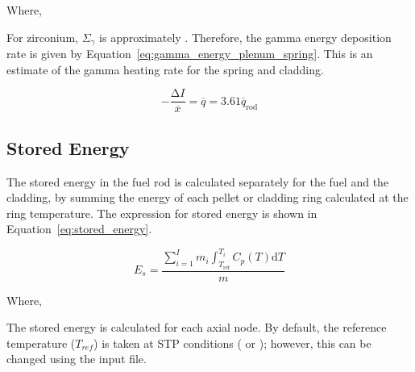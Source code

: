 Where,


For zirconium, \(\Sigma_{\gamma}\) is approximately . Therefore, the gamma energy
deposition rate is given by Equation~\ref{eq:gamma_energy_plenum_spring}. This is an estimate of the
gamma heating rate for the spring and cladding.

\begin{equation}
    \label{eq:gamma_energy_plenum_spring}
    -\frac{\mathrm{\Delta}I}{\overline{x}} = \overline{q} = 3.61{\overline{q}}_{\text{rod}}
\end{equation}

\subsection{Stored Energy}\label{section:stored-energy}

The stored energy in the fuel rod is calculated separately for the fuel and the cladding, by summing
the energy of each pellet or cladding ring calculated at the ring temperature. The expression for
stored energy is shown in Equation~\ref{eq:stored_energy}.

\begin{equation}
    \label{eq:stored_energy}
    E_{s} = \frac{\sum_{i = 1}^{I}{m_{i}\int_{T_{\text{ref}}}^{T_{i}}{C_{p}\left( T \right)\text{d}T}}}{m}
\end{equation}

Where,

The stored energy is calculated for each axial node. By default, the reference temperature
(\(T_{ref}\)) is taken at STP conditions ( or ); however, this can be
changed using the input file.
